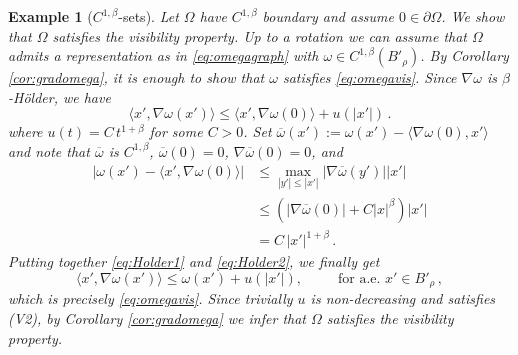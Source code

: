 \documentclass[a4paper,reqno,11pt]{amsart}
\newtheorem{example}[theorem]{Example}
\newcommand{\de}{\partial}
\begin{document}
\begin{example}[$C^{1,\beta}$-sets]
Let $\Omega$ have $C^{1,\beta}$ boundary and assume $0\in \de\Omega$. We show that $\Omega$ satisfies the visibility property. Up to a rotation we can assume that $\Omega$ admits a representation as in \eqref{eq:omegagraph} with $\omega \in C^{1,\beta}(B'_{\rho})$. By Corollary \ref{cor:gradomega}, it is enough to show that $\omega$ satisfies \eqref{eq:omegavis}. Since $\nabla \omega$ is $\beta$-H\"older, we have
\begin{equation} \label{eq:Holder1}
\langle x' , \nabla \omega(x') \rangle \leq \langle x' , \nabla \omega (0) \rangle + u(|x'|) \, .
\end{equation}
where $u(t) = C \, t^{1 + \beta}$ for some $C > 0$. Set $\overline{\omega}(x') := \omega(x') - \langle \nabla \omega (0) , x' \rangle$ and note that $\overline{\omega}$ is $C^{1,\beta}$, $\overline{\omega}(0) = 0$, $\nabla \overline{\omega} (0) = 0$, and
		\begin{align} \label{eq:Holder2}
			|\omega(x') - \langle x' , \nabla \omega (0) \rangle| & \leq \max_{|y'| \leq |x'|} |\nabla \overline{\omega} (y')||x'| \nonumber \\
			& \leq (|\nabla \overline{\omega} (0)| + C |x|^{\beta})|x'| \\
			& = C \, |x'|^{1 + \beta} \, . \nonumber
		\end{align}
		Putting together \eqref{eq:Holder1} and \eqref{eq:Holder2}, we finally get
		\begin{equation*}
			\langle x' , \nabla \omega (x') \rangle \leq \omega(x') + u(|x'|), \, \qquad \text{ for a.e. } x' \in B'_{\rho} \, ,
		\end{equation*}
		which is precisely \eqref{eq:omegavis}. Since trivially $u$ is non-decreasing and satisfies (V2), by Corollary \ref{cor:gradomega} we infer that $\Omega$ satisfies the visibility property.
\end{example}
\end{document}
